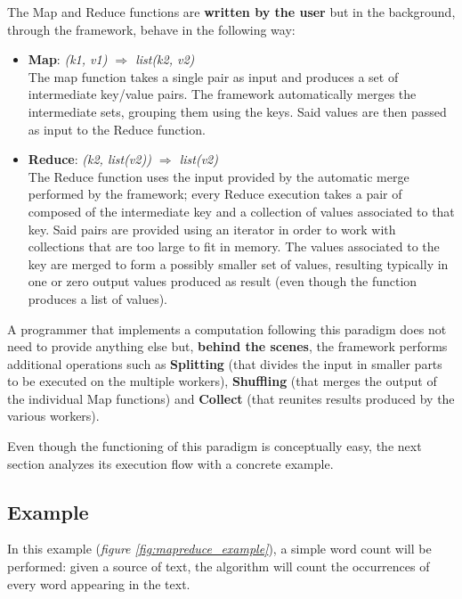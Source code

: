 The Map and Reduce functions are \textbf{written by the user} but in the background, through the framework, behave in the following way:
\begin{itemize}
    \item \textbf{Map}: \textit{(k1, v1) $\Longrightarrow$ list(k2, v2)}\\
    The map function takes a single pair as input and produces a set of intermediate key/value pairs. The framework automatically merges the intermediate sets, grouping them using the keys. Said values are then passed as input to the Reduce function.
    \item \textbf{Reduce}: \textit{(k2, list(v2)) $\Longrightarrow$ list(v2)}\\
    The Reduce function uses the input provided by the automatic merge performed by the framework; every Reduce execution takes a pair of composed of the intermediate key and a collection of values associated to that key. Said pairs are provided using an iterator in order to work with collections that are too large to fit in memory. The values associated to the key are merged to form a possibly smaller set of values, resulting typically in one or zero output values produced as result (even though the function produces a list of values).
\end{itemize}
A programmer that implements a computation following this paradigm does not need to provide anything else but, \textbf{behind the scenes}, the framework performs additional operations such as \textbf{Splitting} (that divides the input in smaller parts to be executed on the multiple workers), \textbf{Shuffling} (that merges the output of the individual Map functions) and \textbf{Collect} (that reunites results produced by the various workers).

Even though the functioning of this paradigm is conceptually easy, the next section analyzes its execution flow with a concrete example.

\subsection{Example}
In this example (\textit{figure \ref{fig:mapreduce_example}}), a simple word count will be performed: given a source of text, the algorithm will count the occurrences of every word appearing in the text.

